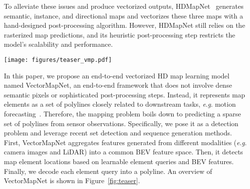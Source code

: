 \documentclass{article}
\newcommand{\eg}{\textit{e}.\textit{g}. }
\theoremstyle{plain}
\theoremstyle{definition}
\theoremstyle{remark}
\begin{document}
To alleviate these issues and produce vectorized outputs, HDMapNet~\citep{li2021hdmapnet} generates semantic, instance, and directional maps and vectorizes these three maps with a hand-designed post-processing algorithm. However, HDMapNet still relies on the rasterized map predictions, and its heuristic post-processing step  restricts the model's scalability and performance. 

\begin{figure*}[tp]
    \centering
    \texttt{[image: figures/teaser\_vmp.pdf]}
    \vspace{-1em}
    \caption{
      An overview of VectorMapNet. Sensor data is encoded to BEV features in the same coordinate as map elements. VectorMapNet detects the locations of map elements from BEV features by leveraging element queries. The vectorized HD map is built upon a sparse set of polylines that are generated from the detection results. Since our polylines are directional, we can infer drivable area of a map.
    }
    \vspace{-1.5em}
    \label{fig:teaser}
\end{figure*}

In this paper, we propose an end-to-end vectorized HD map learning model named VectorMapNet, an end-to-end framework that does not involve dense semantic pixels or sophisticated post-processing steps. Instead, it represents map elements as a set of polylines closely related to downstream tasks, \eg motion forecasting~\citep{vectornet}. Therefore, the mapping problem boils down to predicting a sparse set of polylines from sensor observations. Specifically, we pose it as a detection problem and leverage recent set detection and sequence generation methods. First, VectorMapNet aggregates features generated from different modalities (\eg camera images and LiDAR) into a common BEV feature space. Then, it detects map element locations based on learnable element queries and BEV features. Finally, we decode each element query into a polyline. An overview of VectorMapNet is shown in Figure~\ref{fig:teaser}.
\end{document}
